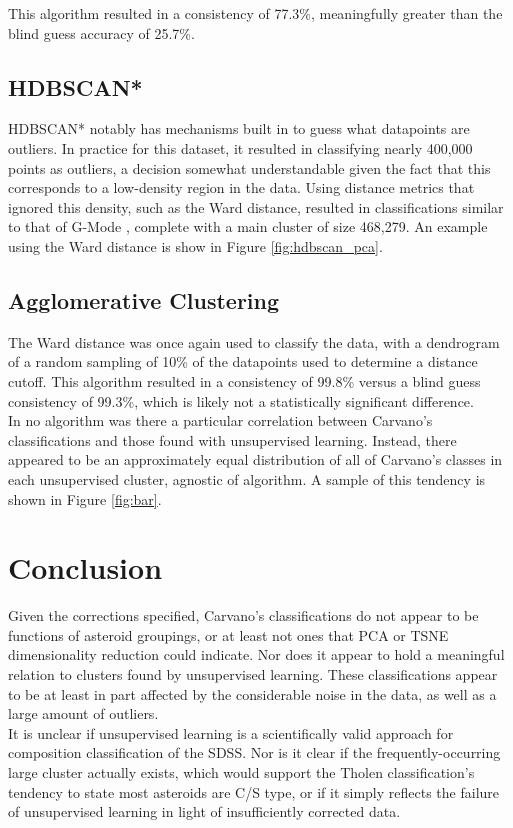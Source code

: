 \documentclass[conference]{IEEEtran}
\begin{document}
This algorithm resulted in a consistency of 77.3\%, meaningfully greater than the blind guess accuracy of 25.7\%.


\subsection{HDBSCAN*}
HDBSCAN* notably has mechanisms built in to guess what datapoints are outliers.
In practice for this dataset, it resulted in classifying nearly 400,000 points as outliers, a decision somewhat understandable given the fact that this corresponds to a low-density region in the data.
Using distance metrics that ignored this density, such as the Ward distance, resulted in classifications similar to that of G-Mode \cite{hm_gmode}, complete with a main cluster of size 468,279.
An example using the Ward distance is show in Figure \ref{fig:hdbscan_pca}.


\subsection{Agglomerative Clustering}
The Ward distance was once again used to classify the data, with a dendrogram of a random sampling of 10\% of the datapoints used to determine a distance cutoff.
This algorithm resulted in a consistency of 99.8\% versus a blind guess consistency of 99.3\%, which is likely not a statistically significant difference.
\\

In no algorithm was there a particular correlation between Carvano's classifications and those found with unsupervised learning. Instead, there appeared to be an approximately equal distribution of all of Carvano's classes in each unsupervised cluster, agnostic of algorithm. A sample of this tendency is shown in Figure \ref{fig:bar}.

\section{Conclusion}
Given the corrections specified, Carvano's classifications do not appear to be functions of asteroid groupings, or at least not ones that PCA or TSNE dimensionality reduction could indicate.
Nor does it appear to hold a meaningful relation to clusters found by unsupervised learning.
These classifications appear to be at least in part affected by the considerable noise in the data, as well as a large amount of outliers. 
\\

It is unclear if unsupervised learning is a scientifically valid approach for composition classification of the SDSS. Nor is it clear if the frequently-occurring large cluster actually exists, which would support the Tholen classification's tendency to state most asteroids are C/S type, or if it simply reflects the failure of unsupervised learning in light of insufficiently corrected data.
\\
\end{document}

